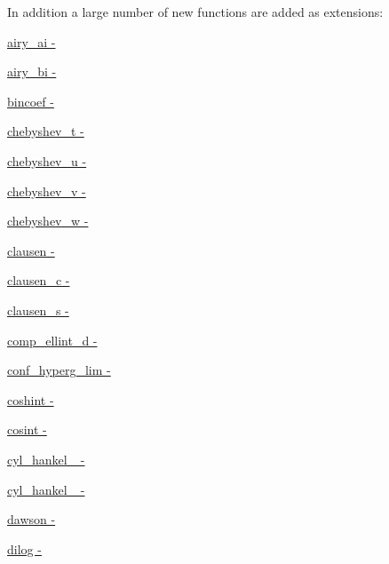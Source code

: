 In addition a large number of new functions are added as extensions\+:
\begin{DoxyItemize}
\item \hyperlink{group__gnu__math__spec__func_ga8eff81346e95e9987002ea52fe1e29a7}{airy\+\_\+ai -\/ }
\item \hyperlink{group__gnu__math__spec__func_ga65253611eb5aec804f9021b085be2a48}{airy\+\_\+bi -\/ }
\item \hyperlink{group__gnu__math__spec__func_ga57a15003ded8e0e808b21d4a17a7803e}{bincoef -\/ }
\item \hyperlink{group__gnu__math__spec__func_gad8769048d3a0eb2adcfcfeaa10af37fe}{chebyshev\+\_\+t -\/ }
\item \hyperlink{group__gnu__math__spec__func_ga59e3a6dd4d614f6e158a0a56fa25a0b1}{chebyshev\+\_\+u -\/ }
\item \hyperlink{group__gnu__math__spec__func_gaf5e47fa5f24acf2aac6c7a1187ee6be1}{chebyshev\+\_\+v -\/ }
\item \hyperlink{group__gnu__math__spec__func_gae283d165c5a058fff7a0f83a2a66b4c2}{chebyshev\+\_\+w -\/ }
\item \hyperlink{group__gnu__math__spec__func_ga5a7016834baf2dd1b57c9dfcfa3436f0}{clausen -\/ }
\item \hyperlink{group__gnu__math__spec__func_ga2e89f9758322054738dacf686f6ce974}{clausen\+\_\+c -\/ }
\item \hyperlink{group__gnu__math__spec__func_ga124827c09e71d83eb11b9e3282739475}{clausen\+\_\+s -\/ }
\item \hyperlink{group__gnu__math__spec__func_gad0fb35dfc5aef8ba2ba5fb88da1192c7}{comp\+\_\+ellint\+\_\+d -\/ }
\item \hyperlink{group__gnu__math__spec__func_gab923b5a9e67469a5145d7bfcb20b3396}{conf\+\_\+hyperg\+\_\+lim -\/ }
\item \hyperlink{group__gnu__math__spec__func_gaceef7e29a05055fa1e1300301f51f139}{coshint -\/ }
\item \hyperlink{group__gnu__math__spec__func_gafa310665ffc65012269f6f90cb573502}{cosint -\/ }
\item \hyperlink{group__gnu__math__spec__func_ga385def5d98679e243626fb78a841795b}{cyl\+\_\+hankel\+\_ -\/ }
\item \hyperlink{group__gnu__math__spec__func_ga307fd77aa8f0ed2028a9fab88976ca54}{cyl\+\_\+hankel\+\_ -\/ }
\item \hyperlink{group__gnu__math__spec__func_ga30e46cb24428cfdb858c52fec431dee4}{dawson -\/ }
\item \hyperlink{group__gnu__math__spec__func_ga8fceba3ecc618971e0e3c089d8dc49cf}{dilog -\/ }

\end{DoxyItemize}
